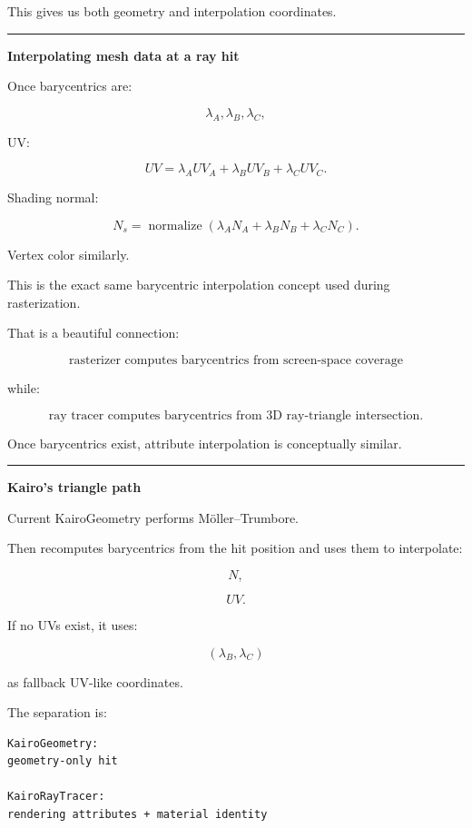 This gives us both geometry and interpolation coordinates.

\begin{center}\rule{0.5\linewidth}{0.5pt}\end{center}

\textbf{Interpolating mesh data at a ray hit}

Once barycentrics are:

\[
\lambda_A,\lambda_B,\lambda_C,
\]

UV:

\[
\boxed{
UV=
\lambda_AUV_A+
\lambda_BUV_B+
\lambda_CUV_C.
}
\]

Shading normal:

\[
\boxed{
N_s=
\operatorname{normalize}
(
\lambda_AN_A+
\lambda_BN_B+
\lambda_CN_C
).
}
\]

Vertex color similarly.

This is the exact same barycentric interpolation concept used during rasterization.

That is a beautiful connection:

\[
\boxed{
\text{rasterizer computes barycentrics from screen-space coverage}
}
\]

while:

\[
\boxed{
\text{ray tracer computes barycentrics from 3D ray-triangle intersection}.
}
\]

Once barycentrics exist, attribute interpolation is conceptually similar.

\begin{center}\rule{0.5\linewidth}{0.5pt}\end{center}

\textbf{Kairo's triangle path}

Current KairoGeometry performs Möller--Trumbore.

Then  recomputes barycentrics from the hit position and uses them to interpolate:

\[
N,
\]

\[
UV.
\]

If no UVs exist, it uses:

\[
(\lambda_B,\lambda_C)
\]

as fallback UV-like coordinates.

The separation is:

\begin{verbatim}
KairoGeometry:
geometry-only hit

KairoRayTracer:
rendering attributes + material identity
\end{verbatim}

